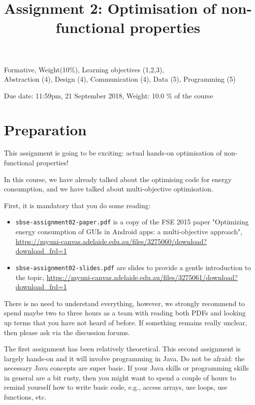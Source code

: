 \documentclass{pracs}
\newcommand{\duedate}{21 September 2018}
\begin{document}
\title{Assignment 2: Optimisation of non-functional properties}
\maketitle
\thispagestyle{fancy}


	Formative, 	Weight(10\%), 	Learning objectives (1,2,3),\\
 	Abstraction (4), 	Design (4), 	Communication (4), 	Data (5),	Programming (5)


\begin{center}
Due date: 11:59pm, \duedate, Weight: 10.0 \% of the course
\end{center}

\sloppy

\section*{Preparation}

This assignment is going to be exciting: actual hands-on optimisation of non-functional properties!

In this course, we have already talked about the optimising code for energy consumption, and we have talked about multi-objective optimisation.

First, it is mandatory that you do some reading: 

\begin{itemize}
\item \texttt{sbse-assignment02-paper.pdf} is a copy of the FSE 2015 paper "Optimizing energy consumption of GUIs in Android apps: a multi-objective approach", \url{https://myuni-canvas.adelaide.edu.au/files/3275060/download?download_frd=1}
\item \texttt{sbse-assignment02-slides.pdf} are slides to provide a gentle introduction to the topic, \url{https://myuni-canvas.adelaide.edu.au/files/3275061/download?download_frd=1}
\end{itemize}

There is no need to understand everything, however, we strongly recommend to spend maybe two to three hours as a team with reading both PDFs and looking up terms that you have not heard of before. If something remains really unclear, then please ask via the discussion forums. 

The first assignment has been relatively theoretical. This second assignment is largely hands-on and it will involve programming in Java. Do not be afraid: the necessary Java concepts are super basic. If your Java skills or programming skills in general are a bit rusty, then you might want to spend a couple of hours to remind yourself how to write basic code, e.g., access arrays, use loops, use functions, etc.
\end{document}
